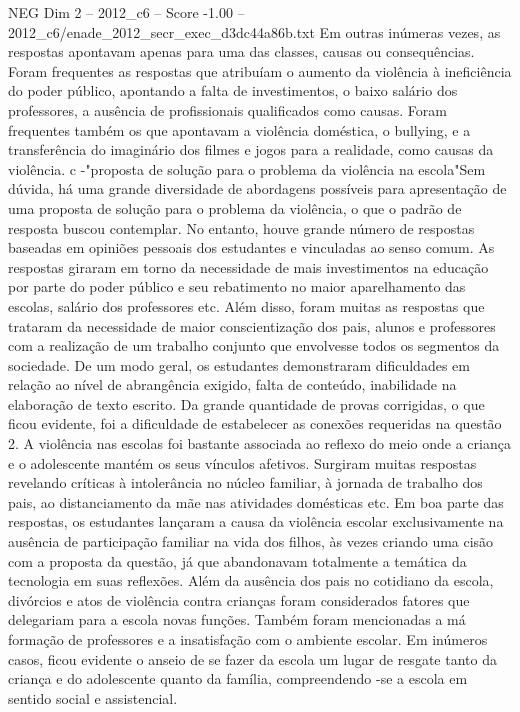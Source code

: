 \begin{textsample}{NEG Dim 2 – 2012\_c6 – Score -1.00 – 2012\_c6/enade\_2012\_secr\_exec\_d3dc44a86b.txt}
Em outras inúmeras vezes, as respostas apontavam apenas para uma das classes, causas ou consequências.
Foram frequentes as respostas que atribuíam o aumento da violência à ineficiência do poder público, apontando a falta de investimentos, o baixo salário dos professores, a ausência de profissionais qualificados como causas.
Foram frequentes também os que apontavam a violência doméstica, o bullying, e a transferência do imaginário dos filmes e jogos para a realidade, como causas da violência. c -"proposta de solução para o problema da violência na escola"Sem dúvida, há uma grande diversidade de abordagens possíveis para apresentação de uma proposta de solução para o problema da violência, o que o padrão de resposta buscou contemplar.
No entanto, houve grande número de respostas baseadas em opiniões pessoais dos estudantes e vinculadas ao senso comum.
As respostas giraram em torno da necessidade de mais investimentos na educação por parte do poder público e seu rebatimento no maior aparelhamento das escolas, salário dos professores etc.
Além disso, foram muitas as respostas que trataram da necessidade de maior conscientização dos pais, alunos e professores com a realização de um trabalho conjunto que envolvesse todos os segmentos da sociedade.
De um modo geral, os estudantes demonstraram dificuldades em relação ao nível de abrangência exigido, falta de conteúdo, inabilidade na elaboração de texto escrito.
Da grande quantidade de provas corrigidas, o que ficou evidente, foi a dificuldade de estabelecer as conexões requeridas na questão 2.
A violência nas escolas foi bastante associada ao reflexo do meio onde a criança e o adolescente mantém os seus vínculos afetivos.
Surgiram muitas respostas revelando críticas à intolerância no núcleo familiar, à jornada de trabalho dos pais, ao distanciamento da mãe nas atividades domésticas etc.
Em boa parte das respostas, os estudantes lançaram a causa da violência escolar exclusivamente na ausência de participação familiar na vida dos filhos, às vezes criando uma cisão com a proposta da questão, já que abandonavam totalmente a temática da tecnologia em suas reflexões.
Além da ausência dos pais no cotidiano da escola, divórcios e atos de violência contra crianças foram considerados fatores que delegariam para a escola novas funções.
Também foram mencionadas a má formação de professores e a insatisfação com o ambiente escolar.
Em inúmeros casos, ficou evidente o anseio de se fazer da escola um lugar de resgate tanto da criança e do adolescente quanto da família, compreendendo -se a escola em sentido social e assistencial.

\end{textsample}

